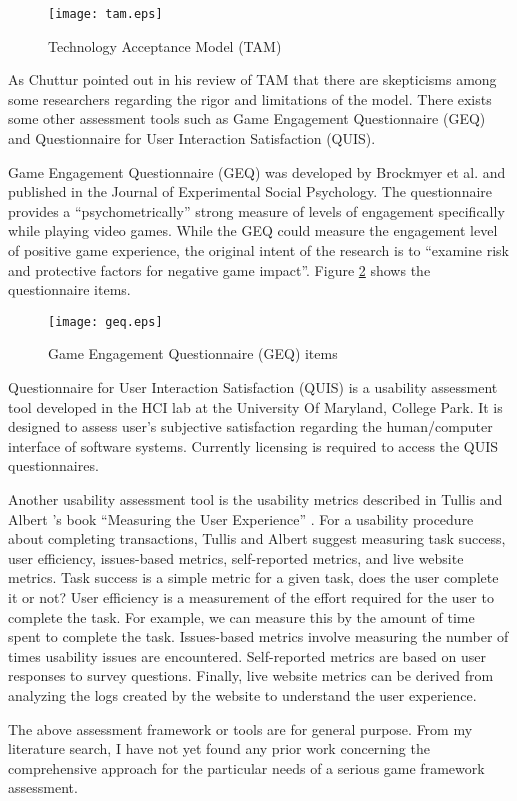 \begin{figure}[htbp]
	\centering
		\texttt{[image: tam.eps]}
		\caption{Technology Acceptance Model (TAM) \cite{davis1986technology}}
		\label{fig:tam}
\end{figure}

As Chuttur \cite{chuttur2009overview} pointed out in his review of TAM that there are skepticisms among some researchers regarding the rigor and limitations of the model. There exists some other assessment tools such as Game Engagement Questionnaire (GEQ) and Questionnaire for User Interaction Satisfaction (QUIS).  

Game Engagement Questionnaire (GEQ) \cite{brockmyer2009development} was developed by Brockmyer et al. and published in the Journal of Experimental Social Psychology. The questionnaire provides a ``psychometrically'' strong measure of levels of engagement specifically while playing video games. While the GEQ could measure the engagement level of positive game experience, the original intent of the research is to ``examine risk and protective factors for negative game impact''. Figure \ref{fig:geq} shows the questionnaire items.

\begin{figure}[htbp]
	\centering
		\texttt{[image: geq.eps]}
		\caption{Game Engagement Questionnaire (GEQ) items \cite{brockmyer2009development}}
		\label{fig:geq}
\end{figure}

Questionnaire for User Interaction Satisfaction (QUIS) \cite{harper1993improving} is a usability assessment tool developed in the HCI lab at the University Of Maryland, College Park. It is designed to assess user's subjective satisfaction regarding the human/computer interface of software systems. Currently licensing is required to access the QUIS questionnaires. 

Another usability assessment tool is the usability metrics described in Tullis and Albert 's book ``Measuring the User Experience'' \cite{tullis2010measuring}. For a usability procedure about completing transactions, Tullis and Albert suggest measuring task success, user efficiency, issues-based metrics, self-reported metrics, and live website metrics. Task success is a simple metric for a given task, does the user complete it or not? User efficiency is a measurement
of the effort required for the user to complete the task. For example, we can measure this by the amount of time spent to complete the task. Issues-based metrics involve measuring the number of times usability issues are encountered. Self-reported metrics are based on user responses to survey questions. Finally, live website metrics can be derived from analyzing the logs created by the website to understand the user experience.

The above assessment framework or tools are for general purpose. From my literature search, I have not yet found any prior work concerning the comprehensive approach for the particular needs of a serious game framework assessment. 